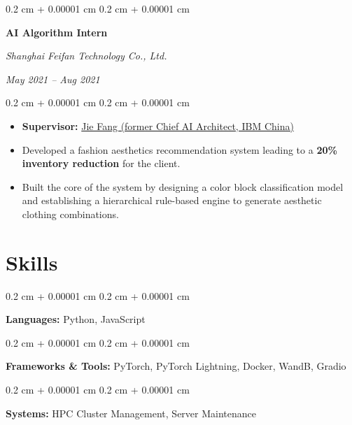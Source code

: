 \documentclass[10pt, letterpaper]{article}
\newenvironment{highlights}{
    \begin{itemize}[
        topsep=0.05 cm,
        parsep=0.05 cm,
        partopsep=0pt,
        itemsep=0pt,
        leftmargin=0.4 cm + 10pt
    ]
}{
    \end{itemize}
} %
\newenvironment{onecolentry}{
    \begin{adjustwidth}{
        0.2 cm + 0.00001 cm
    }{
        0.2 cm + 0.00001 cm
    }
}{
    \end{adjustwidth}
} %
\newenvironment{twocolentry}[2][]{
    \onecolentry
    \def\secondColumn{#2}
    \setcolumnwidth{\fill, 4.5 cm}
    \begin{paracol}{2}
}{
    \switchcolumn \raggedleft \secondColumn
    \end{paracol}
    \endonecolentry
} %
\begin{document}
    \vspace{0.1cm}

    \begin{twocolentry}{
        \textit{May 2021 – Aug 2021}
    }
        \textbf{AI Algorithm Intern}
        
        \textit{Shanghai Feifan Technology Co., Ltd.}
    \end{twocolentry}
    \begin{onecolentry}
        \begin{highlights}
            \item \textbf{Supervisor:} \href{https://www.linkedin.com/in/jie-fang-28293740}{Jie Fang (former Chief AI Architect, IBM China)}
            \item Developed a fashion aesthetics recommendation system leading to a \textbf{20\% inventory reduction} for the client.
            \item Built the core of the system by designing a color block classification model and establishing a hierarchical rule-based engine to generate aesthetic clothing combinations.            %
        \end{highlights}
    \end{onecolentry}
    
    \section{Skills}
        \begin{onecolentry}
            \textbf{Languages:} Python, JavaScript
        \end{onecolentry}
        \begin{onecolentry}
            \textbf{Frameworks \& Tools:} PyTorch, PyTorch Lightning, Docker, WandB, Gradio
        \end{onecolentry}
        \begin{onecolentry}
            \textbf{Systems:} HPC Cluster Management, Server Maintenance
        \end{onecolentry}
\end{document}
